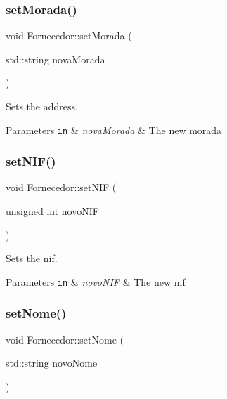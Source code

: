 \subsubsection{\texorpdfstring{set\+Morada()}{setMorada()}}
{\footnotesize\ttfamily void Fornecedor\+::set\+Morada (\begin{DoxyParamCaption}\item[{std\+::string}]{nova\+Morada }\end{DoxyParamCaption})\hspace{0.3cm}{\ttfamily [inline]}}



Sets the address. 


\begin{DoxyParams}[1]{Parameters}
\mbox{\tt in}  & {\em nova\+Morada} & The new morada \\
\hline
\end{DoxyParams}
\mbox{\label{classFornecedor_a9bbb88ef7aa281df4042aeedadcd510e}} 
\subsubsection{\texorpdfstring{set\+N\+I\+F()}{setNIF()}}
{\footnotesize\ttfamily void Fornecedor\+::set\+N\+IF (\begin{DoxyParamCaption}\item[{unsigned int}]{novo\+N\+IF }\end{DoxyParamCaption})\hspace{0.3cm}{\ttfamily [inline]}}



Sets the nif. 


\begin{DoxyParams}[1]{Parameters}
\mbox{\tt in}  & {\em novo\+N\+IF} & The new nif \\
\hline
\end{DoxyParams}
\mbox{\label{classFornecedor_a2f207b2242cf6ec5d76a3808dbb4fd80}} 
\subsubsection{\texorpdfstring{set\+Nome()}{setNome()}}
{\footnotesize\ttfamily void Fornecedor\+::set\+Nome (\begin{DoxyParamCaption}\item[{std\+::string}]{novo\+Nome }\end{DoxyParamCaption})\hspace{0.3cm}{\ttfamily [inline]}}



